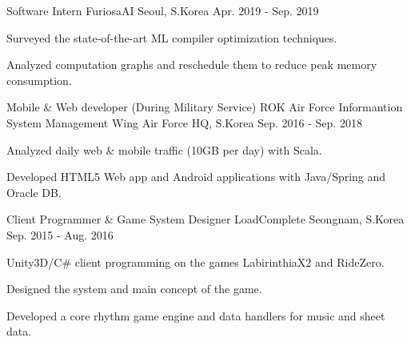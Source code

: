 

\begin{cventries}

  \cventry
  {Software Intern} %
  {FuriosaAI} %
  {Seoul, S.Korea} %
  {Apr. 2019 - Sep. 2019} %
  {
    \begin{cvitems} %
      \item {Surveyed the state-of-the-art ML compiler optimization techniques.}
      \item {Analyzed computation graphs and reschedule them to reduce peak memory consumption.}
    \end{cvitems}
  }

  \cventry
  {Mobile \& Web developer (During Military Service)} %
  {ROK Air Force Informantion System Management Wing} %
  {Air Force HQ, S.Korea} %
  {Sep. 2016 - Sep. 2018} %
  {
    \begin{cvitems} %
      \item {Analyzed daily web \& mobile traffic (10GB per day) with Scala.}
      \item {Developed HTML5 Web app and Android applications with Java/Spring and Oracle DB.}
    \end{cvitems}
  }

  \cventry
  {Client Programmer \& Game System Designer} %
  {LoadComplete} %
  {Seongnam, S.Korea} %
  {Sep. 2015 - Aug. 2016} %
  {
    \begin{cvitems} %
      \item {Unity3D/C\# client programming on the games LabirinthiaX2 and RideZero.}
      \item {Designed the system and main concept of the game.}
      \item {Developed a core rhythm game engine and data handlers for music and sheet data.}
    \end{cvitems}
  }
\end{cventries}
